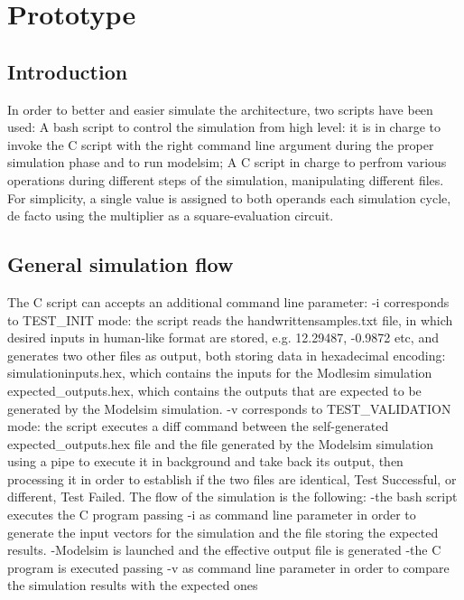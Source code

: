 %
\chapter{Prototype}
\label{chap1}
\section{Introduction}
In order to better and easier simulate the architecture, two scripts have been used:
A bash script to control the simulation from high level: it is in charge to invoke the C script with the right command line argument during the proper simulation phase and to 
run modelsim;
A C script in charge to perfrom various operations during different steps of the simulation, manipulating different files.
For simplicity, a single value is assigned to both operands each simulation cycle, de facto using the multiplier as a square-evaluation circuit.
\section{General simulation flow}
The C script can accepts an additional command line parameter:
-i corresponds to TEST\_INIT mode: the script reads the handwrittensamples.txt file, in which desired inputs in human-like format are stored, e.g. 12.29487, -0.9872 etc, 
and generates two other files as output, both storing data in hexadecimal encoding:
simulationinputs.hex, which contains the inputs for the Modlesim simulation
expected\_outputs.hex, which contains the outputs that are expected to be generated by the Modelsim simulation.
-v corresponds to TEST\_VALIDATION mode: the script executes a diff command between the self-generated expected\_outputs.hex file and the file generated by the Modelsim simulation using 
a pipe to execute it in background and take back its output, then processing it in order to establish if the two files are identical, Test Successful, or different, Test Failed.
The flow of the simulation is the following:
-the bash script executes the C program passing -i as command line parameter in order to generate the input vectors for the simulation and the file storing the expected results.
-Modelsim is launched and the effective output file is generated
-the C program is executed passing -v as command line parameter in order to compare the simulation results with the expected ones

